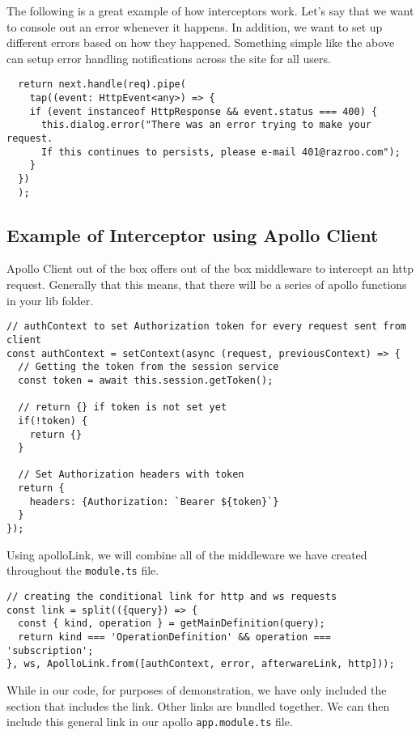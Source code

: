 The following is a great example of how interceptors work. Let's say that we
want to console out an error whenever it happens. In addition, we want to 
set up different errors based on how they happened. Something simple like 
the above can setup error handling notifications across the site for all users.  
\begin{lstlisting}
  return next.handle(req).pipe(
    tap((event: HttpEvent<any>) => {
    if (event instanceof HttpResponse && event.status === 400) {
      this.dialog.error("There was an error trying to make your request. 
      If this continues to persists, please e-mail 401@razroo.com");
    }
  })
  );
\end{lstlisting}

\subsection{Example of Interceptor using Apollo Client}
Apollo Client out of the box offers out of the box middleware to intercept an
http request. Generally that this means, that there will be a series of 
apollo functions in your lib folder. 

\begin{lstlisting}
// authContext to set Authorization token for every request sent from client
const authContext = setContext(async (request, previousContext) => {
  // Getting the token from the session service
  const token = await this.session.getToken();

  // return {} if token is not set yet
  if(!token) {
    return {}
  }

  // Set Authorization headers with token
  return {
    headers: {Authorization: `Bearer ${token}`}
  }
});
\end{lstlisting}

Using apolloLink, we will combine all of the middleware we have created 
throughout the \lstinline{module.ts} file. 

\begin{lstlisting}
// creating the conditional link for http and ws requests
const link = split(({query}) => {
  const { kind, operation } = getMainDefinition(query);
  return kind === 'OperationDefinition' && operation === 'subscription';
}, ws, ApolloLink.from([authContext, error, afterwareLink, http]));
\end{lstlisting}

While in our code, for purposes of demonstration, we have only included the
section that includes the link. Other links are bundled together. We can 
then include this general link in our apollo \lstinline{app.module.ts} file.

